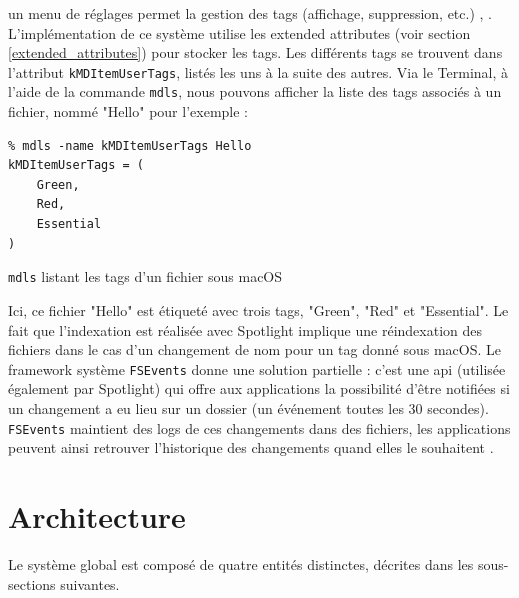 \documentclass[a4paper, 12pt]{article}
\newenvironment{code}{\captionsetup{type=listing}}{}
\begin{document}
un menu de réglages permet la gestion des tags (affichage, suppression, etc.) \cite{ref5}, 
\cite{ref6}. L'implémentation de ce système utilise les extended attributes (voir section 
\ref{extended_attributes}) pour stocker les tags. Les différents tags se trouvent dans l'attribut 
\texttt{kMDItemUserTags}, listés les uns à la suite des autres. Via le Terminal, à 
l'aide de la commande \texttt{mdls}, nous pouvons afficher la liste des tags associés à 
un fichier, nommé "Hello" pour l'exemple :
\bigbreak
\begin{code}
    \begin{verbatim}
% mdls -name kMDItemUserTags Hello 
kMDItemUserTags = (
    Green,
    Red,
    Essential
)
    \end{verbatim}
    \caption{\texttt{mdls} listant les tags d'un fichier sous macOS \cite{ref7}}
\end{code}
\bigbreak
Ici, ce fichier "Hello" est étiqueté avec trois tags, "Green", "Red" et "Essential". Le fait que 
l'indexation est réalisée avec Spotlight implique une réindexation des fichiers dans le cas d'un 
changement de nom pour un tag donné sous macOS. Le framework système \texttt{FSEvents} 
donne une solution partielle : c'est une \acrshort{api} (utilisée également par Spotlight) qui offre aux 
applications la possibilité d'être notifiées si un changement a eu lieu sur un dossier (un événement 
toutes les 30 secondes). \texttt{FSEvents} maintient des logs de ces changements dans 
des fichiers, les applications peuvent ainsi retrouver l'historique des changements quand elles 
le souhaitent \cite{ref10}.

\newpage



\section{Architecture} %

Le système global est composé de quatre entités distinctes, décrites dans les sous-sections suivantes.
\end{document}
